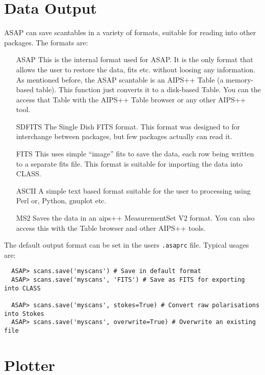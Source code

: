 \documentclass[11pt]{article}
\begin{document}
\section{Data Output}

ASAP can save scantables in a
variety of formats, suitable for reading into other packages. The
formats are:

\begin{itemize}
\item[ASAP] This is the internal format used for ASAP. It is the only
  format that allows the user to restore the data, fits etc. without
  loosing any information.  As mentioned before, the ASAP scantable is
  an AIPS++ Table (a memory-based table).  This function just converts
  it to a disk-based Table.  You can the access that Table with the
  AIPS++ Table browser or any other AIPS++ tool.

\item[SDFITS] The Single Dish FITS format. This format was designed to
  for interchange between packages, but few packages actually can read
  it.

\item[FITS] This uses simple ``image'' fits to save the data, each row
  being written to a separate fits file. This format is suitable for
  importing the data into CLASS.

\item[ASCII] A simple text based format suitable for the user to
processing using Perl or, Python, gnuplot etc.

\item[MS2] Saves the data in an aips++ MeasurementSet V2 format.
You can also access this with the Table browser and other AIPS++
tools.

\end{itemize}

The default output format can be set in the users {\tt .asaprc} file.
Typical usages are:

\begin{verbatim}
  ASAP> scans.save('myscans') # Save in default format
  ASAP> scans.save('myscans', 'FITS') # Save as FITS for exporting into CLASS

  ASAP> scans.save('myscans', stokes=True) # Convert raw polarisations into Stokes
  ASAP> scans.save('myscans', overwrite=True) # Overwrite an existing file
\end{verbatim}


\section{Plotter}
\end{document}
